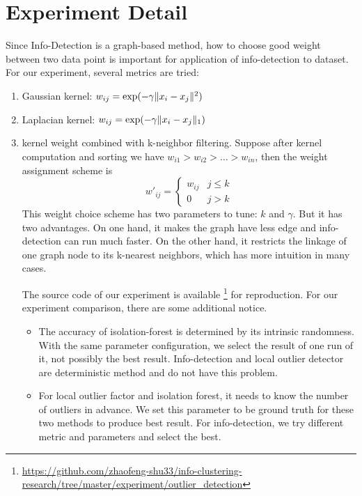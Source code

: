 \documentclass[runningheads]{llncs}
\begin{document}
\section{Experiment Detail}
Since Info-Detection is a graph-based method, how to choose good weight between two data point is important for application of info-detection to dataset. For our experiment, several metrics are tried: 
\begin{enumerate}
\item Gaussian kernel: $w_{ij} = \exp(-\gamma \lVert x_i - x_j\rVert^2)$
\item Laplacian kernel: $w_{ij} = \exp(-\gamma \lVert x_i - x_j\rVert_1)$
\item kernel weight combined with k-neighbor filtering. Suppose after kernel computation and sorting we have $w_{i1} > w_{i2} > \dots > w_{in}$, then the weight assignment scheme is
$$
w'_{ij}  = 
\begin{cases}
 w_{ij} & j \leq k \\
 0 & j > k
\end{cases}
$$
This weight choice scheme has two parameters to tune: $k$ and $\gamma$. But it has two advantages. On one hand, it makes the graph have less edge and info-detection can run much faster. On the other hand, it restricts the linkage of one graph node to its k-nearest neighbors, which has more intuition in many cases.

The source code of our experiment is available \footnote{\scriptsize\url{https://github.com/zhaofeng-shu33/info-clustering-research/tree/master/experiment/outlier\_detection}} for reproduction.
For our experiment comparison, there are some additional notice.
\begin{itemize}
\item The accuracy of isolation-forest is determined by its intrinsic randomness. With the same parameter configuration, we select the result of one run of it, not possibly the best result. Info-detection and local outlier detector are deterministic method and do not have this problem.
\item For local outlier factor and isolation forest, it needs to know the number of outliers in advance. We set this parameter to be ground truth for these two methods to produce best result. For info-detection, we try different metric and parameters and select the best.
\end{itemize}

\end{enumerate} 
\end{document}
